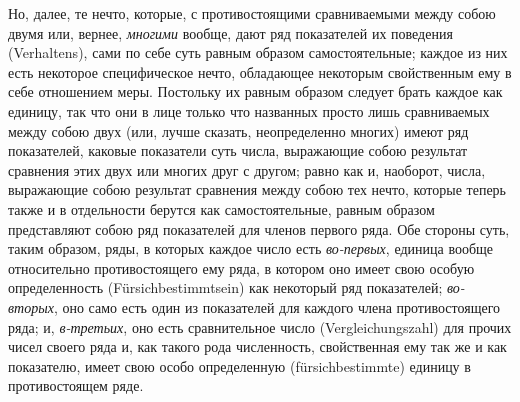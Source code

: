Но, далее, те нечто, которые, с противостоящими сравниваемыми между собою
двумя или, вернее, {\em многими} вообще, дают ряд
показателей их поведения (Verhaltens), сами по себе суть равным образом
самостоятельные; каждое из них есть некоторое специфическое нечто,
обладающее некоторым свойственным ему в себе отношением меры. Постольку их
равным образом следует брать каждое как единицу, так что они в лице только
что названных просто лишь сравниваемых между собою двух (или, лучше
сказать, неопределенно многих) имеют ряд показателей, каковые показатели
суть числа, выражающие собою результат сравнения этих двух или многих друг
с другом; равно как и, наоборот, числа, выражающие собою результат
сравнения между собою тех нечто, которые теперь также и в отдельности
берутся как самостоятельные, равным образом представляют собою ряд
показателей для членов первого ряда. Обе стороны суть, таким образом, ряды,
в которых каждое число есть {\em во-первых}, единица
вообще относительно противостоящего ему ряда, в котором оно имеет свою
особую определенность (Fürsichbestimmtsein) как некоторый ряд показателей;
{\em во-вторых}, оно само есть один из показателей для
каждого члена противостоящего ряда; и, {\em в-третьих},
оно есть сравнительное число (Vergleichungszahl) для прочих чисел своего
ряда и, как такого рода численность, свойственная ему так же и как
показателю, имеет свою особо определенную (fürsichbestimmte) единицу в
противостоящем ряде.

